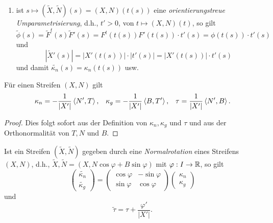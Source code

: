\begin{lemma, definition}
\begin{remark}
\begin{enumerate}
		\item ist $s \mapsto (\widetilde{X}, \widetilde{N})(s) = (X,N)(t(s))$ eine \emph{orientierungstreue Umparametrisierung}, d.h., $t' >0$, von $t \mapsto (X,N)(t)$, so gilt
		\[\widetilde{\phi}(s) = \widetilde{F}^t(s)\widetilde{F}'(s) = F^t(t(s))F'(t(s))\cdot t'(s) =\phi(t(s)) \cdot t'(s) \] und \[ |\widetilde{X}'(s)| = |X'(t(s))|\cdot|t'(s)| =  |X'(t(s))|\cdot t'(s) \] und damit $\widetilde{\kappa_n}(s)= \kappa_n(t(s))$ usw.
	\end{enumerate}
\end{remark}

\begin{lemma}
	Für einen Streifen $(X,N)$ gilt
	\begin{align*}
		\kappa_n = -\frac 1{\left| X'\right|}\left \langle N',T \right\rangle, &&
		\kappa_g = -\frac 1{\left| X'\right|}\left \langle B,T' \right\rangle, &&
		\tau = \frac 1{\left| X'\right|} \left \langle N',B \right\rangle.
	\end{align*}
\end{lemma}
\begin{proof}
	Dies folgt sofort aus der Definition von $\kappa_n,\kappa_g$ und $\tau$ und aus der Orthonormalität von $T,N$ und $B$.
\end{proof}

\begin{remark, definition}
	Ist ein Streifen $(\widetilde{X},\widetilde{N})$ gegeben durch eine \emph{Normalrotation} eines Streifens $(X,N)$, d.h., $\widetilde{X}, \widetilde{N} = (X,N \cos \varphi + B \sin \varphi)$ mit $\varphi: I \rightarrow \mathbb R$, so gilt
	\begin{equation*}
	\begin{pmatrix} 
		\widetilde{\kappa_n}\\
		\widetilde{\kappa_g}
	\end{pmatrix}
	=
	 \begin{pmatrix} 
	 \cos \varphi & - \sin \varphi \\
	 \sin \varphi & \cos \varphi
	 \end{pmatrix}
	 \begin{pmatrix}
	 \kappa_n\\
	 \kappa_g
	 \end{pmatrix}
	\end{equation*} und
	$$\widetilde{\tau} = \tau + \frac{\varphi'}{|X'|}  .$$
	
	
\end{remark, definition}
	
\end{lemma, definition}

